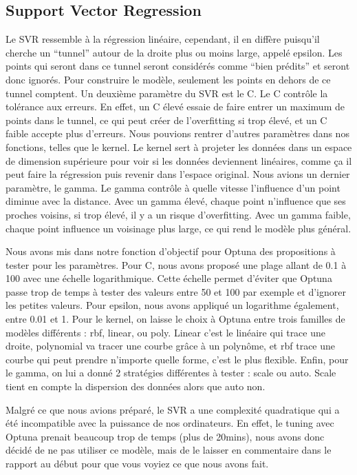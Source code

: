 \documentclass[mstat,12pt]{unswthesis}
\begin{document}
\subsection{\textbf{Support Vector Regression}}

Le SVR ressemble à la régression linéaire, cependant, il en diffère puisqu’il cherche un “tunnel” autour de la droite plus ou moins large, appelé epsilon. Les points qui seront dans ce tunnel seront considérés comme “bien prédits” et seront donc ignorés. Pour construire le modèle, seulement les points en dehors de ce tunnel comptent. Un deuxième paramètre du SVR est le C. Le C contrôle la tolérance aux erreurs. En effet, un C élevé essaie de faire entrer un maximum de points dans le tunnel, ce qui peut créer de l’overfitting si trop élevé, et un C faible accepte plus d’erreurs. Nous pouvions rentrer d’autres paramètres dans nos fonctions, telles que le kernel. Le kernel sert à projeter les données dans un espace de dimension supérieure pour voir si les données deviennent linéaires, comme ça il peut faire la régression puis revenir dans l’espace original. Nous avions un dernier paramètre, le gamma. Le gamma contrôle à quelle vitesse l’influence d’un point diminue avec la distance. Avec un gamma élevé, chaque point n’influence que ses proches voisins, si trop élevé, il y a un risque d’overfitting. Avec un gamma faible, chaque point influence un voisinage plus large, ce qui rend le modèle plus général.

Nous avons mis dans notre fonction d’objectif pour Optuna des propositions à tester pour les paramètres. Pour C, nous avons proposé une plage allant de 0.1 à 100 avec une échelle logarithmique. Cette échelle permet d’éviter que Optuna passe trop de temps à tester des valeurs entre 50 et 100 par exemple et d’ignorer les petites valeurs. Pour epsilon, nous avons appliqué un logarithme également, entre 0.01 et 1. Pour le kernel, on laisse le choix à Optuna entre trois familles de modèles différents : rbf, linear, ou poly. Linear c’est le linéaire qui trace une droite, polynomial va tracer une courbe grâce à un polynôme, et rbf trace une courbe qui peut prendre n’importe quelle forme, c’est le plus flexible. Enfin, pour le gamma, on lui a donné 2 stratégies différentes à tester : scale ou auto. Scale tient en compte la dispersion des données alors que auto non.

Malgré ce que nous avions préparé, le SVR a une complexité quadratique qui a été incompatible avec la puissance de nos ordinateurs. En effet, le tuning avec Optuna prenait beaucoup trop de temps (plus de 20mins), nous avons donc décidé de ne pas utiliser ce modèle, mais de le laisser en commentaire dans le rapport au début pour que vous voyiez ce que nous avons fait. \\
\end{document}
